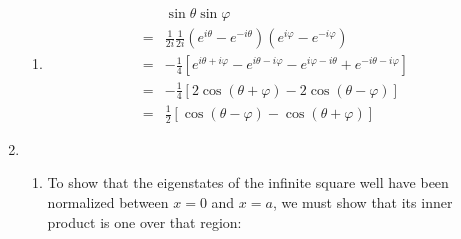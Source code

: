 \documentclass[10pt]{article}
\begin{document}
\begin{enumerate}
\begin{enumerate}
    \item 
      \begin{align*}
        & \sin \theta \sin \varphi \\
        = & \frac{1}{2i}\frac{1}{2i}\left( e ^ {i\theta }-e ^ {-i\theta } \right) \left( e ^ {i\varphi }-e ^ {-i\varphi } \right) \\
        =& -\frac{1}{4} \left[ e ^ {i\theta +i\varphi } - e ^ {i\theta -i\varphi } - e ^ {i\varphi -i\theta } + e ^ {-i\theta -i\varphi } \right] \\
        =& -\frac{1}{4} \left[ 2\cos \left( \theta +\varphi  \right) - 2\cos \left( \theta -\varphi  \right) \right] \\
        =& \frac{1}{2} \left[ \cos \left( \theta -\varphi  \right) - \cos \left( \theta +\varphi  \right) \right]
      \end{align*}
    \end{enumerate}
  \item
  \begin{enumerate}
    
    \item 
    To show that the eigenstates of the infinite square well have been normalized between $ x=0 $ and $ x=a $, we must show that its inner product is one over that region:


\end{enumerate}
\end{enumerate}
\end{document}
